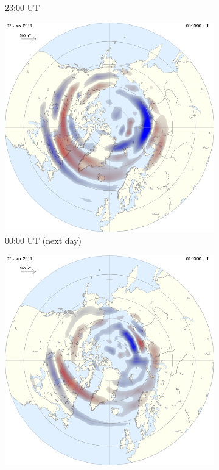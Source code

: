 \documentclass[10pt,a4paper]{article}
\begin{document}
\begin{figure}[h]
\begin{subfigure}{0.3\textwidth}
	\caption{ 23:00 UT \label{amp23}}
\end{subfigure}
\begin{subfigure}{0.3\textwidth}
\centering
	\includegraphics[width=\textwidth]{ampere6.png}
	\caption{ 00:00 UT (next day) \label{amp00}}
\end{subfigure}
\begin{subfigure}{0.3\textwidth}
\centering
	\includegraphics[width=\textwidth]{ampere7.png}

\end{subfigure}
\end{figure}
\end{document}
